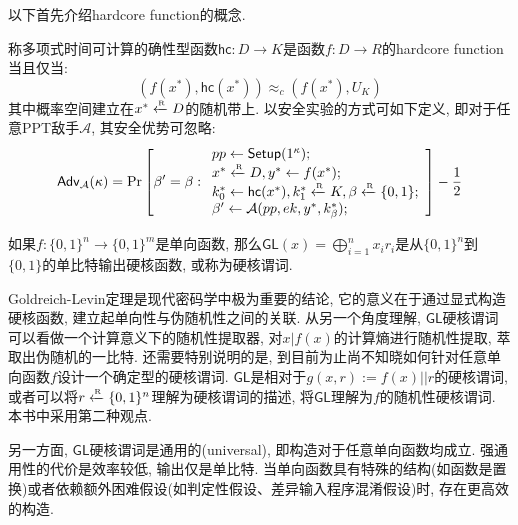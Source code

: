 以下首先介绍hardcore function的概念. 
\begin{definition}
称多项式时间可计算的确性型函数$\mathsf{hc}: D \rightarrow K$是函数$f: D \rightarrow R$的hardcore function当且仅当: 
\begin{equation*}
	(f(x^*), \mathsf{hc}(x^*)) \approx_c (f(x^*), U_K) 
\end{equation*} 
其中概率空间建立在$x^* \xleftarrow{\textup{\tiny R}} D$的随机带上. 以安全实验的方式可如下定义, 即对于任意PPT敌手$\mathcal{A}$, 其安全优势可忽略: 
\begin{displaymath}
	\mathsf{Adv}_\mathcal{A}(\kappa) =
		\Pr \left[ \beta'=\beta: 
			\begin{array}{l}
         		pp \leftarrow \mathsf{Setup}(1^\kappa);\\
         		x^* \xleftarrow{\textup{\tiny R}} D, y^* \leftarrow f(x^*);\\
         		k_0^* \leftarrow \mathsf{hc}(x^*), k_1^* \xleftarrow{\textup{\tiny R}} K, \beta \xleftarrow{\textup{\tiny R}} \{0,1\};\\
         		\beta' \leftarrow \mathcal{A}(pp, ek, y^*, k_\beta^*);
			\end{array} 
		\right] - \frac{1}{2}
\end{displaymath}	
\end{definition}  

\begin{center}
\end{center}

\begin{theorem} 
如果$f: \{0,1\}^n \rightarrow \{0,1\}^m$是单向函数, 
那么$\mathsf{GL}(x) = \bigoplus_{i=1}^n x_i r_i$是从$\{0,1\}^n$到$\{0,1\}$的单比特输出硬核函数, 或称为硬核谓词. 
\end{theorem}

\begin{remark}
Goldreich-Levin定理是现代密码学中极为重要的结论, 它的意义在于通过显式构造硬核函数, 建立起单向性与伪随机性之间的关联. 
从另一个角度理解, $\mathsf{GL}$硬核谓词可以看做一个计算意义下的随机性提取器, 
对$x|f(x)$的计算熵进行随机性提取, 萃取出伪随机的一比特. 
还需要特别说明的是, 到目前为止尚不知晓如何针对任意单向函数$f$设计一个确定型的硬核谓词. 
$\mathsf{GL}$是相对于$g(x, r):=f(x)||r$的硬核谓词, 或者可以将$r \xleftarrow{\textup{\tiny R}} \{0,1\}^n$理解为硬核谓词的描述, 
将$\mathsf{GL}$理解为$f$的随机性硬核谓词. 
本书中采用第二种观点.  

另一方面, $\mathsf{GL}$硬核谓词是通用的(universal), 即构造对于任意单向函数均成立. 强通用性的代价是效率较低, 输出仅是单比特. 
当单向函数具有特殊的结构(如函数是置换)或者依赖额外困难假设(如判定性假设、差异输入程序混淆假设)时, 存在更高效的构造. 
\end{remark}

